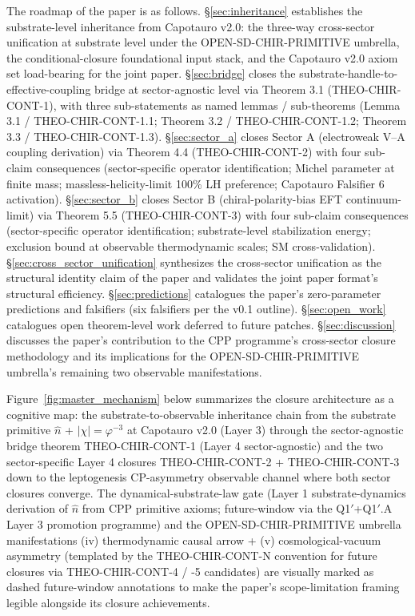 \documentclass[11pt,letterpaper]{article}
\begin{document}
The roadmap of the paper is as follows. §\ref{sec:inheritance} establishes the substrate-level inheritance from Capotauro v2.0: the three-way cross-sector unification at substrate level under the OPEN-SD-CHIR-PRIMITIVE umbrella, the conditional-closure foundational input stack, and the Capotauro v2.0 axiom set load-bearing for the joint paper. §\ref{sec:bridge} closes the substrate-handle-to-effective-coupling bridge at sector-agnostic level via Theorem 3.1 (THEO-CHIR-CONT-1), with three sub-statements as named lemmas / sub-theorems (Lemma 3.1 / THEO-CHIR-CONT-1.1; Theorem 3.2 / THEO-CHIR-CONT-1.2; Theorem 3.3 / THEO-CHIR-CONT-1.3). §\ref{sec:sector_a} closes Sector A (electroweak V--A coupling derivation) via Theorem 4.4 (THEO-CHIR-CONT-2) with four sub-claim consequences (sector-specific operator identification; Michel parameter at finite mass; massless-helicity-limit 100\% LH preference; Capotauro Falsifier 6 activation). §\ref{sec:sector_b} closes Sector B (chiral-polarity-bias EFT continuum-limit) via Theorem 5.5 (THEO-CHIR-CONT-3) with four sub-claim consequences (sector-specific operator identification; substrate-level stabilization energy; exclusion bound at observable thermodynamic scales; SM cross-validation). §\ref{sec:cross_sector_unification} synthesizes the cross-sector unification as the structural identity claim of the paper and validates the joint paper format's structural efficiency. §\ref{sec:predictions} catalogues the paper's zero-parameter predictions and falsifiers (six falsifiers per the v0.1 outline). §\ref{sec:open_work} catalogues open theorem-level work deferred to future patches. §\ref{sec:discussion} discusses the paper's contribution to the CPP programme's cross-sector closure methodology and its implications for the OPEN-SD-CHIR-PRIMITIVE umbrella's remaining two observable manifestations.

Figure~\ref{fig:master_mechanism} below summarizes the closure architecture as a cognitive map: the substrate-to-observable inheritance chain from the substrate primitive $\hat{n}$ + $|\chi| = \varphi^{-3}$ at Capotauro v2.0 (Layer 3) through the sector-agnostic bridge theorem THEO-CHIR-CONT-1 (Layer 4 sector-agnostic) and the two sector-specific Layer 4 closures THEO-CHIR-CONT-2 + THEO-CHIR-CONT-3 down to the leptogenesis CP-asymmetry observable channel where both sector closures converge. The dynamical-substrate-law gate (Layer 1 substrate-dynamics derivation of $\hat{n}$ from CPP primitive axioms; future-window via the Q1$'$+Q1$'$.A Layer 3 promotion programme) and the OPEN-SD-CHIR-PRIMITIVE umbrella manifestations (iv) thermodynamic causal arrow + (v) cosmological-vacuum asymmetry (templated by the THEO-CHIR-CONT-N convention for future closures via THEO-CHIR-CONT-4 / -5 candidates) are visually marked as dashed future-window annotations to make the paper's scope-limitation framing legible alongside its closure achievements.
\end{document}
